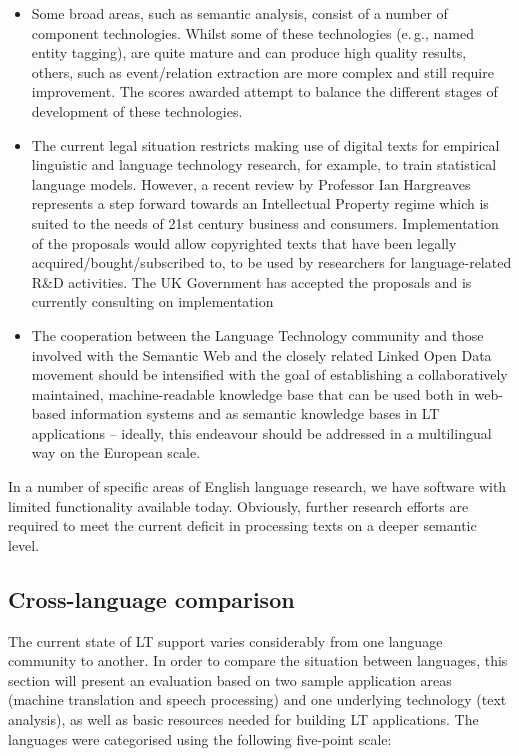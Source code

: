 \documentclass[]{../../metanetpaper}
\begin{document}
\begin{multicols}{2}
\begin{itemize}
\item Some broad areas, such as semantic analysis, consist of a number of component technologies. Whilst some of these technologies (e.\,g., named entity tagging), are quite mature and can produce high quality results, others, such as event/relation extraction are more complex and still require improvement. The scores awarded attempt to balance the different stages of development of these technologies.     
\item The current legal situation restricts making use of digital texts for empirical linguistic and language technology research, for example, to train statistical language models.  However, a recent review by Professor Ian Hargreaves represents a step forward towards an Intellectual Property regime which is suited to the needs of 21st century business and consumers. Implementation of the proposals would allow copyrighted texts that have been legally acquired/bought/subscribed to, to be used by researchers for language-related R\&D activities. The UK Government has accepted the proposals and is currently consulting on implementation     
\item The cooperation between the Language Technology community and those involved with the Semantic Web and the closely related Linked Open Data movement should be intensified with the goal of establishing a collaboratively maintained, machine-readable knowledge base that can be used both in web-based information systems and as semantic knowledge bases in LT applications -- ideally, this endeavour should be addressed in a multilingual way on the European scale.  
\end{itemize}

In a number of specific areas of English language research, we have software with limited functionality available today. Obviously, further research efforts are required to meet the current deficit in processing texts on a deeper semantic level.

\subsection{Cross-language comparison}

The current state of LT support varies considerably from one language community to another. In order to compare the situation between languages, this section will present an evaluation based on two sample application areas (machine translation and speech processing) and one underlying technology (text analysis), as well as basic resources needed for building LT applications. The languages were categorised using the following five-point scale: 


\end{multicols}
\end{document}
